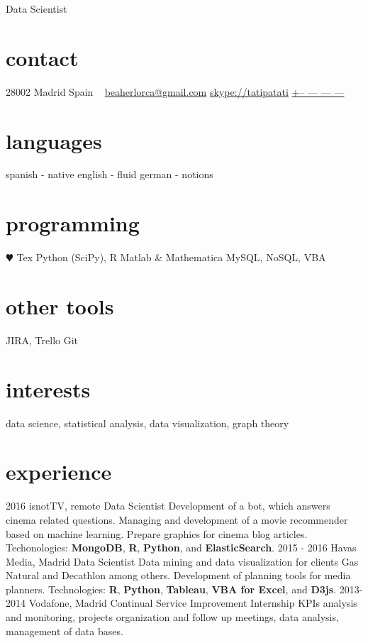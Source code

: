 \documentclass[]{friggeri-cv}
\begin{document}
\ifenglish
{}
       {Data Scientist}


\begin{aside}
  \section{contact}
    28002 Madrid
    Spain
    ~
    \href{mailto:beaherlorca@gmail.com}{beaherlorca@gmail.com}
    \href{skype:<tatipatati>[add]}{skype://tatipatati}
    \href{tel:xxxxxxxxxxx}{+-- --- --- ---}
  \section{languages}
    spanish - native
    english - fluid
    german - notions
  \section{programming}
    {\color{red} $\varheartsuit$} Tex
    Python (SciPy), R
    Matlab \& Mathematica
    MySQL, NoSQL, VBA
  \section{other tools}
    JIRA, Trello
    Git
\end{aside}

\section{interests}

data science, statistical analysis, data visualization, graph theory

\section{experience}

\begin{entrylist}
  \entry
    {2016}
    {isnotTV, remote}
    {Data Scientist}
    {Development of a bot, which answers cinema related questions. Managing and development of a movie recommender based on machine learning. Prepare graphics for cinema blog articles. Techonologies: \textbf{MongoDB}, \textbf{R}, \textbf{Python}, and \textbf{ElasticSearch}.}
  \entry
    {2015 - 2016}
    {Havas Media, Madrid}
    {Data Scientist}
    {Data mining and data visualization for clients Gas Natural and Decathlon among others. Development of planning tools for media planners. Technologies: \textbf{R}, \textbf{Python}, \textbf{Tableau}, \textbf{VBA for Excel}, and \textbf{D3js}.}
  \entry
    {2013-2014}
    {Vodafone, Madrid}
    {Continual Service Improvement Internship}
    {KPIs analysis and monitoring, projects organization and follow up meetings, data analysis, management of data bases.}
\end{entrylist}
\end{document}
